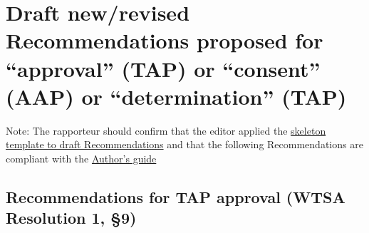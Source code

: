 



\section{Draft new/revised Recommendations proposed for ``approval'' (TAP) or ``consent'' (AAP) or ``determination'' (TAP)}\label{draft-newrevised-recommendations-proposed-for-approval-tap-or-consent-aap-or-determination-tap}

Note: The rapporteur should confirm that the editor applied the \href{https://www.itu.int/en/ITU-T/studygroups/Documents/Doc-ITUT-Recs-Skelet.docx}{skeleton template to draft Recommendations} and that the following Recommendations are compliant with the \href{https://www.itu.int/oth/T0AF000004/en}{Author's guide}

\subsection{Recommendations for TAP approval (WTSA Resolution 1, \S9)}\label{recommendations-for-tap-approval-wtsa-resolution-19}


